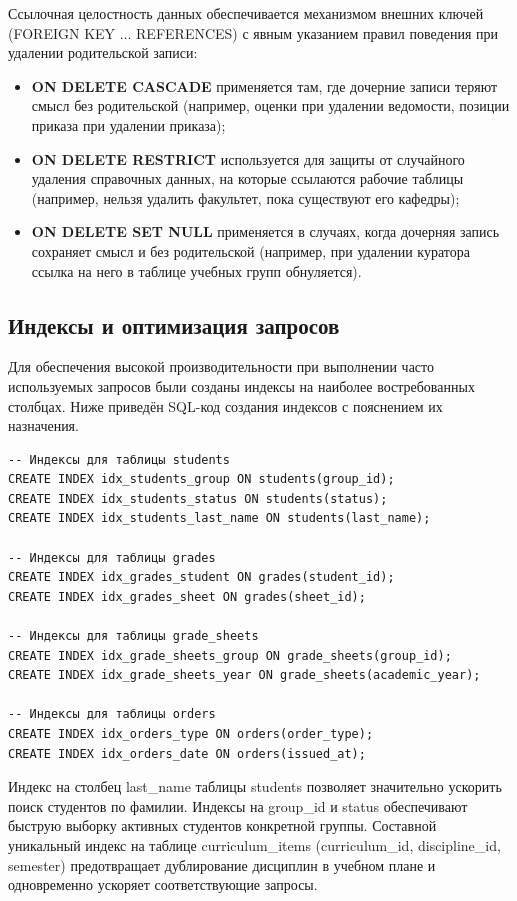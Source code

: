 \documentclass[14pt, a4paper]{extreport}
\begin{document}
Ссылочная целостность данных обеспечивается механизмом внешних ключей (FOREIGN KEY ... REFERENCES) с явным указанием правил поведения при удалении родительской записи:
\begin{itemize}
    \item \textbf{ON DELETE CASCADE} применяется там, где дочерние записи теряют смысл без родительской (например, оценки при удалении ведомости, позиции приказа при удалении приказа);
    \item \textbf{ON DELETE RESTRICT} используется для защиты от случайного удаления справочных данных, на которые ссылаются рабочие таблицы (например, нельзя удалить факультет, пока существуют его кафедры);
    \item \textbf{ON DELETE SET NULL} применяется в случаях, когда дочерняя запись сохраняет смысл и без родительской (например, при удалении куратора ссылка на него в таблице учебных групп обнуляется).
\end{itemize}

\subsection{Индексы и оптимизация запросов}
Для обеспечения высокой производительности при выполнении часто используемых запросов были созданы индексы на наиболее востребованных столбцах. Ниже приведён SQL-код создания индексов с пояснением их назначения.

\begin{lstlisting}[caption={Создание индексов для оптимизации запросов}]
-- Индексы для таблицы students
CREATE INDEX idx_students_group ON students(group_id);
CREATE INDEX idx_students_status ON students(status);
CREATE INDEX idx_students_last_name ON students(last_name);

-- Индексы для таблицы grades
CREATE INDEX idx_grades_student ON grades(student_id);
CREATE INDEX idx_grades_sheet ON grades(sheet_id);

-- Индексы для таблицы grade_sheets
CREATE INDEX idx_grade_sheets_group ON grade_sheets(group_id);
CREATE INDEX idx_grade_sheets_year ON grade_sheets(academic_year);

-- Индексы для таблицы orders
CREATE INDEX idx_orders_type ON orders(order_type);
CREATE INDEX idx_orders_date ON orders(issued_at);
\end{lstlisting}

Индекс на столбец last\_name таблицы students позволяет значительно ускорить поиск студентов по фамилии. Индексы на group\_id и status обеспечивают быструю выборку активных студентов конкретной группы. Составной уникальный индекс на таблице curriculum\_items (curriculum\_id, discipline\_id, semester) предотвращает дублирование дисциплин в учебном плане и одновременно ускоряет соответствующие запросы.
\end{document}
